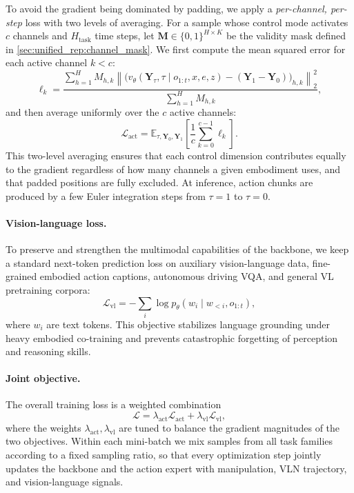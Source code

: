 \documentclass{llmxive}
\begin{document}
To avoid the gradient being dominated by padding, we apply a \emph{per-channel, per-step} loss with two levels of averaging.
For a sample whose control mode activates $c$ channels and $H_{\text{task}}$ time steps, let $\mathbf{M} \in \{0,1\}^{H \times K}$ be the validity mask defined in \cref{sec:unified_rep:channel_mask}.
We first compute the mean squared error for each active channel $k < c$:
\begin{equation}
\ell_k = \frac{
    \displaystyle\sum_{h=1}^{H} M_{h,k}
    \left\| \bigl(v_\theta(\mathbf{Y}_\tau, \tau \mid o_{1:t}, x, e, z) - (\mathbf{Y}_1 - \mathbf{Y}_0)\bigr)_{h,k} \right\|_2^2
}{
    \displaystyle\sum_{h=1}^{H} M_{h,k}
},
\end{equation}
and then average uniformly over the $c$ active channels:
\begin{equation}
\mathcal{L}_{\text{act}} = \mathbb{E}_{\tau,\mathbf{Y}_0,\mathbf{Y}_1} \left[ \frac{1}{c} \sum_{k=0}^{c-1} \ell_k \right].
\end{equation}
This two-level averaging ensures that each control dimension contributes equally to the gradient regardless of how many channels a given embodiment uses, and that padded positions are fully excluded.
At inference, action chunks are produced by a few Euler integration steps from $\tau=1$ to $\tau=0$.

\paragraph{Vision-language loss.}
To preserve and strengthen the multimodal capabilities of the backbone, we keep a standard next-token prediction loss on auxiliary vision-language data, fine-grained embodied action captions, autonomous driving VQA, and general VL pretraining corpora:
\begin{equation}
\mathcal{L}_{\text{vl}} = - \sum_{i} \log p_\theta(w_i \mid w_{<i}, o_{1:t}),
\end{equation}
where $w_i$ are text tokens. This objective stabilizes language grounding under heavy embodied co-training and prevents catastrophic forgetting of perception and reasoning skills.

\paragraph{Joint objective.}
The overall training loss is a weighted combination
\begin{equation}
\mathcal{L} = \lambda_{\text{act}} \mathcal{L}_{\text{act}} + \lambda_{\text{vl}} \mathcal{L}_{\text{vl}},
\end{equation}
where the weights $\lambda_{\text{act}}, \lambda_{\text{vl}}$ are tuned to balance the gradient magnitudes of the two objectives. Within each mini-batch we mix samples from all task families according to a fixed sampling ratio, so that every optimization step jointly updates the backbone and the action expert with manipulation, VLN trajectory, and vision-language signals.
\end{document}
